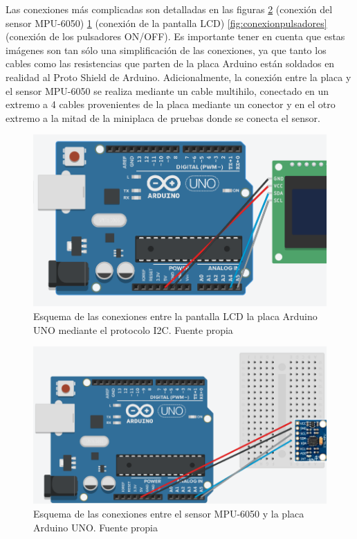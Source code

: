 Las conexiones más complicadas son detalladas en las figuras \ref{fig:conexionmpu} (conexión del sensor MPU-6050) \ref{fig:conexionpantalla} (conexión de la pantalla LCD) \ref{fig:conexionpulsadores} (conexión de los pulsadores ON/OFF). Es importante tener en cuenta que estas imágenes son tan sólo una simplificación de las conexiones, ya que tanto los cables como las resistencias que parten de la placa Arduino están soldados en realidad al Proto Shield de Arduino. Adicionalmente, la conexión entre la placa y el sensor MPU-6050 se realiza mediante un cable multihilo, conectado en un extremo a 4 cables provenientes de la placa mediante un conector y en el otro extremo a la mitad de la miniplaca de pruebas donde se conecta el sensor.
\begin{figure}[h]
    \centering
    \includegraphics[width=1\textwidth]{img/conexionpantalla.png}
    \caption{Esquema de las conexiones entre la pantalla LCD la placa Arduino UNO mediante el protocolo I2C. Fuente propia}
    \label{fig:conexionpantalla}
\end{figure}
\begin{figure}[h]
    \centering
    \includegraphics[width=1\textwidth]{img/Conexionmpu.png}
    \caption{Esquema de las conexiones entre el sensor MPU-6050 y la placa Arduino UNO. Fuente propia}
    \label{fig:conexionmpu}
\end{figure}
